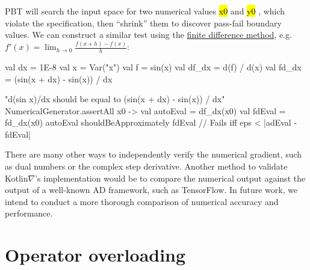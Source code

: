 \documentclass[12pt,initial,twoside,maitrise]{dms}
\newcommand{\inline}[1]{%
    \begingroup%
    \sethlcolor{slightgray}%
    \hl{\ttfamily\footnotesize #1}%
    \endgroup
}
\numberwithin{equation}{section}
\numberwithin{table}{chapter}
\numberwithin{figure}{chapter}
\begin{document}
%
PBT will search the input space for two numerical values \inline{x0} and \inline{y0}, which violate the specification, then ``shrink'' them to discover pass-fail boundary values. We can construct a similar test using the \hyperref[sec:fdm]{finite difference method}, e.g. $f'(x)=\lim _{h\to 0}{\frac {f(x+h)-f(x)}{h}}$:
%
\begin{kotlinlisting}
val dx = 1E-8
val x = Var("x")
val f = sin(x)
val df_dx = d(f) / d(x)
val fd_dx = (sin(x + dx) - sin(x)) / dx

"d(sin x)/dx should be equal to (sin(x + dx) - sin(x)) / dx" {
    NumericalGenerator.assertAll { x0 ->
        val autoEval = df_dx(x0)
        val fdEval = fd_dx(x0)
        autoEval shouldBeApproximately fdEval // Fails iff eps < |adEval - fdEval|
    }
}
\end{kotlinlisting}
%
There are many other ways to independently verify the numerical gradient, such as dual numbers or the complex step derivative. Another method to validate Kotlin$\nabla$'s implementation would be to compare the numerical output against the output of a well-known AD framework, such as TensorFlow. In future work, we intend to conduct a more thorough comparison of numerical accuracy and performance.

\section{Operator overloading}\label{sec:operator-overloading}
\end{document}
